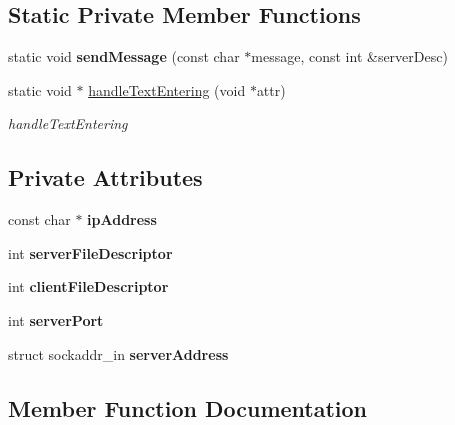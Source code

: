 \subsection*{Static Private Member Functions}
\begin{DoxyCompactItemize}
\item 
\mbox{\label{classClient_a12b2e78efc9c7cfb0b6054b84dcb8b2b}} 
static void {\bfseries send\+Message} (const char $\ast$message, const int \&server\+Desc)
\item 
static void $\ast$ \hyperlink{classClient_ac5bd556f663337b31a577fd0c4d20b7d}{handle\+Text\+Entering} (void $\ast$attr)
\begin{DoxyCompactList}\small\item\em handle\+Text\+Entering \end{DoxyCompactList}\end{DoxyCompactItemize}
\subsection*{Private Attributes}
\begin{DoxyCompactItemize}
\item 
\mbox{\label{classClient_af4529e7aa1a4e33f1188eec378aa67ca}} 
const char $\ast$ {\bfseries ip\+Address}
\item 
\mbox{\label{classClient_aa76d70f374ad1e46f20dae0b7144c7f0}} 
int {\bfseries server\+File\+Descriptor}
\item 
\mbox{\label{classClient_a25f4f12005a1527b584c3f1324b43fcf}} 
int {\bfseries client\+File\+Descriptor}
\item 
\mbox{\label{classClient_a4345c8b8a92e6fb5a66e89694ef003e1}} 
int {\bfseries server\+Port}
\item 
\mbox{\label{classClient_a9886b7cfa9b826616d28160c47d6dd89}} 
struct sockaddr\+\_\+in {\bfseries server\+Address}
\end{DoxyCompactItemize}


\subsection{Member Function Documentation}
\mbox{\label{classClient_a214cdda23175ba7cc4f94037730cbfd4}} 
